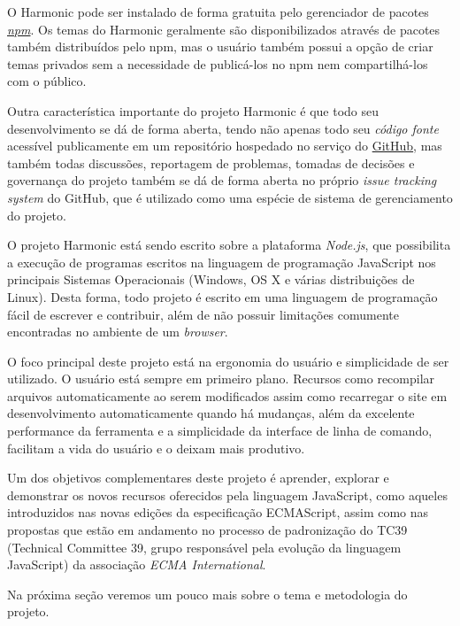 \documentclass[ppginf, pep]{esinucpel}
\begin{document}
O Harmonic pode ser instalado de forma gratuita pelo gerenciador de pacotes \href{https://www.npmjs.com/}{\emph{npm}}. Os temas do Harmonic geralmente são disponibilizados através de pacotes também distribuídos pelo npm, mas o usuário também possui a opção de criar temas privados sem a necessidade de publicá-los no npm nem compartilhá-los com o público.

Outra característica importante do projeto Harmonic é que todo seu desenvolvimento se dá de forma aberta, tendo não apenas todo seu \emph{código fonte} acessível publicamente em um repositório hospedado no serviço do \href{https://github.com/}{GitHub}, mas também todas discussões, reportagem de problemas, tomadas de decisões e governança do projeto também se dá de forma aberta no próprio \textit{issue tracking system} do GitHub, que é utilizado como uma espécie de sistema de gerenciamento do projeto.

O projeto Harmonic está sendo escrito sobre a plataforma \emph{Node.js}, que possibilita a execução de programas escritos na linguagem de programação JavaScript nos principais Sistemas Operacionais (Windows, OS X e várias distribuições de Linux). Desta forma, todo projeto é escrito em uma linguagem de programação fácil de escrever e contribuir, além de não possuir limitações comumente encontradas no ambiente de um \textit{browser}.

O foco principal deste projeto está na ergonomia do usuário e simplicidade de ser utilizado. O usuário está sempre em primeiro plano. Recursos como recompilar arquivos automaticamente ao serem modificados assim como recarregar o site em desenvolvimento automaticamente quando há mudanças, além da excelente performance da ferramenta e a simplicidade da interface de linha de comando, facilitam a vida do usuário e o deixam mais produtivo.

Um dos objetivos complementares deste projeto é aprender, explorar e demonstrar os novos recursos oferecidos pela linguagem JavaScript, como aqueles introduzidos nas novas edições da especificação ECMAScript, assim como nas propostas que estão em andamento no processo de padronização do TC39 (Technical Committee 39, grupo responsável pela evolução da linguagem JavaScript) da associação \textit{ECMA International}. %

Na próxima seção veremos um pouco mais sobre o tema e metodologia do projeto. %
\end{document}
